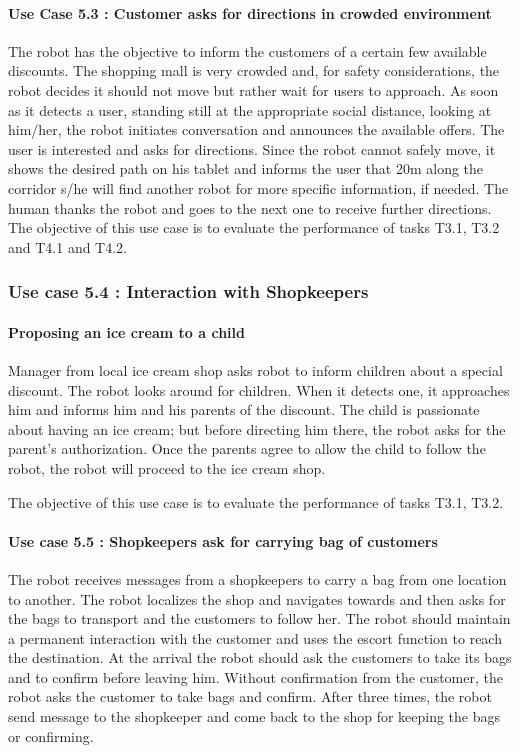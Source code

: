 \paragraph*{Use Case 5.3 : Customer asks for directions in crowded environment} The robot has the objective to inform the customers of a certain few
available discounts. The shopping mall is very crowded and, for safety
considerations, the robot decides it should not move but rather wait
for users to approach. As soon as it detects a user, standing still at
the appropriate social distance, looking at him/her, the robot initiates
conversation and announces the available offers. The user is interested
and asks for directions. Since the robot cannot safely move, it shows
the desired path on his tablet and informs the user that 20m along
the corridor s/he will find another robot for more specific information,
if needed. The human thanks the robot and goes to the next one to
receive further directions.
The objective of this use case is to evaluate the performance of tasks T3.1, T3.2 and T4.1 and T4.2.

\subsubsection {Use case 5.4 : Interaction with Shopkeepers}
\paragraph*{Proposing an ice cream to a child} Manager from local ice cream shop asks robot to inform children about
a special discount. The robot looks around for children. When it detects
one, it approaches him and informs him and his parents of the discount. The child
is passionate about having an ice cream; but before directing him
there, the robot asks for the parent's authorization. Once the parents
agree to allow the child to follow the robot, the robot will proceed
to the ice cream shop. 

The objective of this use case is to evaluate the performance of tasks T3.1, T3.2.

\paragraph*{Use case 5.5 : Shopkeepers ask for carrying bag of customers}
The robot receives messages from a shopkeepers to carry a bag from one location to another. The robot localizes the shop and navigates towards and then asks for the bags to transport and the customers to follow her. The robot should maintain a permanent interaction with the customer and uses the escort function to reach the destination. At the arrival the robot should ask the customers to take its bags and to confirm before leaving him. Without confirmation from the customer, the robot asks the customer to take bags and confirm. After three times, the robot send message to the shopkeeper and come back to the shop for keeping the bags or confirming.

